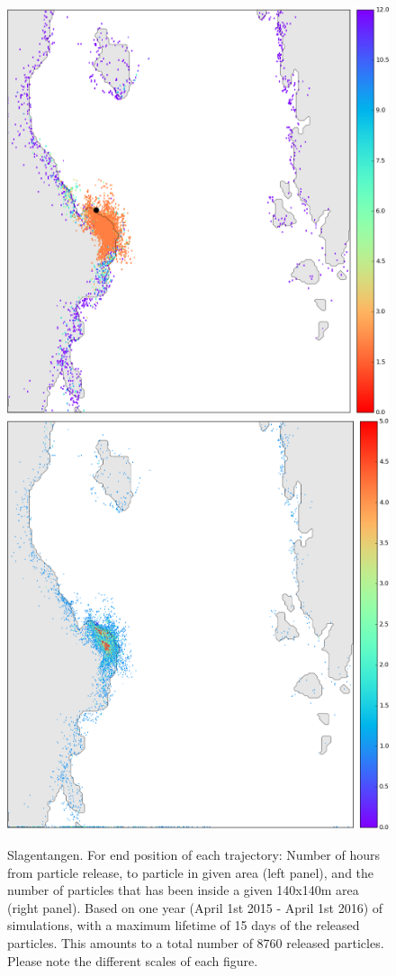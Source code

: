 \begin{figure}[ht]
\centerline{
\includegraphics*[width=.5\textwidth]{Figurer/opendrift/opendrift_slagen_shortest_time_zoom_endpos_crop}
\includegraphics*[width=.5\textwidth]{Figurer/opendrift/opendrift_slagen_consentration_zoom_endpos_crop}
}
\caption{\small
Slagentangen. For end position of each trajectory: Number of hours from particle release, to particle in given area (left panel), and the number of particles that has been inside a given 140x140m area (right panel). Based on one year (April 1st 2015 - April 1st 2016) of simulations, with a maximum lifetime of 15 days of the released particles. This amounts to a total number of 8760 released particles. Please note the different scales of each figure.}
\label{fig:opendrift_slagen2}
\end{figure}
